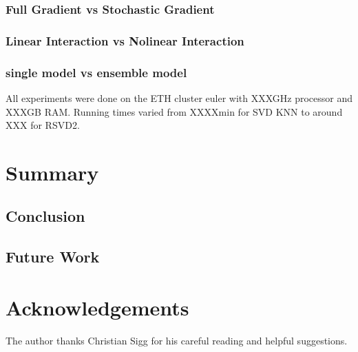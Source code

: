 \documentclass[10pt,conference,compsocconf]{IEEEtran}
\begin{document}
\subsubsection{Full Gradient vs Stochastic Gradient}

\subsubsection{Linear Interaction vs Nolinear Interaction}
\subsubsection{single model vs ensemble model}

All experiments were done on the ETH cluster euler with XXXGHz processor and XXXGB RAM. Running times varied from XXXXmin for SVD KNN to around XXX for RSVD2.

\section{Summary}
\subsection{Conclusion}
\subsection{Future Work} 



\section*{Acknowledgements}
The author thanks Christian Sigg for his careful reading and helpful
suggestions.



\end{document}
